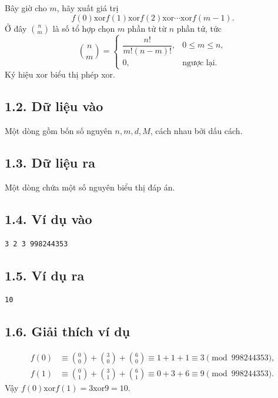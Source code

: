 \documentclass[11pt]{article}
\begin{document}
Bây giờ cho \(m\), hãy xuất giá trị
\[
  f(0)\mathbin{\mathrm{xor}}f(1)\mathbin{\mathrm{xor}}f(2)
  \mathbin{\mathrm{xor}}\cdots\mathbin{\mathrm{xor}}f(m-1).
\]
Ở đây \(\binom{n}{m}\) là số tổ hợp chọn \(m\) phần tử từ \(n\) phần tử, tức
\[
  \binom{n}{m}=
  \begin{cases}
    \dfrac{n!}{m!(n-m)!}, & 0\le m\le n,\\
    0, & \text{ngược lại}.
  \end{cases}
\]
Ký hiệu \(\mathrm{xor}\) biểu thị phép xor.

\subsection*{1.2. Dữ liệu vào}

Một dòng gồm bốn số nguyên \(n,m,d,M\), cách nhau bởi dấu cách.

\subsection*{1.3. Dữ liệu ra}

Một dòng chứa một số nguyên biểu thị đáp án.

\subsection*{1.4. Ví dụ vào}

\begin{verbatim}
3 2 3 998244353
\end{verbatim}

\subsection*{1.5. Ví dụ ra}

\begin{verbatim}
10
\end{verbatim}

\subsection*{1.6. Giải thích ví dụ}

\[
\begin{aligned}
  f(0)&\equiv \binom{0}{0}+\binom{3}{0}+\binom{6}{0}
        \equiv 1+1+1\equiv 3 \pmod {998244353},\\
  f(1)&\equiv \binom{0}{1}+\binom{3}{1}+\binom{6}{1}
        \equiv 0+3+6\equiv 9 \pmod {998244353}.
\end{aligned}
\]
Vậy \(f(0)\mathbin{\mathrm{xor}}f(1)=3\mathbin{\mathrm{xor}}9=10\).
\end{document}
